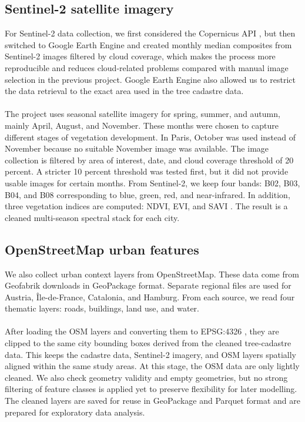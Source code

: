 \subsection{Sentinel-2 satellite imagery}

For Sentinel-2 data collection, we first considered the Copernicus API \cite{copernicus2025}, but then switched to Google Earth Engine \cite{earthenginecodeeditor} and created monthly median composites from Sentinel-2 images filtered by cloud coverage, which makes the process more reproducible and reduces cloud-related problems compared with manual image selection in the previous project. Google Earth Engine also allowed us to restrict the data retrieval to the exact area used in the tree cadastre data.\\
\\
The project uses seasonal satellite imagery for spring, summer, and autumn, mainly April, August, and November. These months were chosen to capture different stages of vegetation development. In Paris, October was used instead of November because no suitable November image was available. The image collection is filtered by area of interest, date, and cloud coverage threshold of 20 percent. A stricter 10 percent threshold was tested first, but it did not provide usable images for certain months. From Sentinel-2, we keep four bands: B02, B03, B04, and B08 \cite{sentinel2harmonized} corresponding to blue, green, red, and near-infrared. In addition, three vegetation indices are computed: NDVI, EVI, and SAVI \cite{ndvitutorial}. The result is a cleaned multi-season spectral stack for each city.

\subsection{OpenStreetMap urban features}
We also collect urban context layers from OpenStreetMap. These data come from Geofabrik downloads \cite{geofabrikeurope} in GeoPackage format. Separate regional files are used for Austria, Île-de-France, Catalonia, and Hamburg. From each source, we read four thematic layers: roads, buildings, land use, and water.\\
\\
After loading the OSM layers and converting them to EPSG:4326 \cite{epsg4326}, they are clipped to the same city bounding boxes derived from the cleaned tree-cadastre data. This keeps the cadastre data, Sentinel-2 imagery, and OSM layers spatially aligned within the same study areas. At this stage, the OSM data are only lightly cleaned. We also check geometry validity and empty geometries, but no strong filtering of feature classes is applied yet to preserve flexibility for later modelling. The cleaned layers are saved for reuse in GeoPackage and Parquet format and are prepared for exploratory data analysis.



